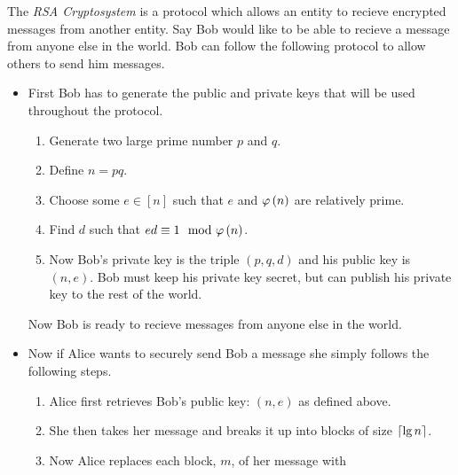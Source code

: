         \begin{definition}
            The \emph{RSA Cryptosystem} is a protocol which allows an entity to recieve
            encrypted messages from another entity. Say Bob would like to be able to recieve
            a message from anyone else in the world. Bob can follow the following protocol
            to allow others to send him messages.
            \begin{itemize}
                \item
                    First Bob has to generate the public and private keys that will
                    be used throughout the protocol.
                    \begin{enumerate}
                        \item
                            Generate two large prime number $p$ and $q$.
                        \item
                            Define $n = pq$.
                        \item
                            Choose some $e \in [n]$ such that $e$ and $\varphi\left(n\right)$ are
                            relatively prime.
                        \item
                            Find $d$ such that $ed \equiv 1 \mod \eulerphi{n}$.
                        \item 
                            Now Bob's private key is the triple $(p, q, d)$ and his public
                            key is $(n, e)$. Bob must keep his private key secret, but 
                            can publish his private key to the rest of the world.
                    \end{enumerate}
                    Now Bob is ready to recieve messages from anyone else in the world.
                \item
                    Now if Alice wants to securely send Bob a message she simply follows 
                    the following steps.
                    \begin{enumerate}
                        \item
                            Alice first retrieves Bob's public key: $(n, e)$ as defined above.
                        \item
                            She then takes her message and breaks it up into blocks of size $\left\lceil \lg n \right\rceil$.
                        \item
                            Now Alice replaces each block, $m$, of her message with

\end{enumerate}
\end{itemize}
\end{definition}
